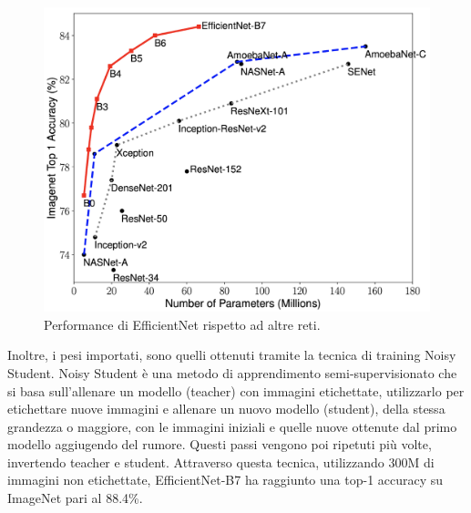         \begin{figure}[h!]
            \centering
            \includegraphics[scale=0.2]{Plot/efficientnet.png}
            \caption{Performance di EfficientNet rispetto ad altre reti.}
            \label{fig:efficientnet}
        \end{figure}
        
        Inoltre, i pesi importati, sono quelli ottenuti tramite la tecnica di training Noisy Student. Noisy Student è una metodo di apprendimento semi-supervisionato che si basa sull'allenare
        un modello (teacher) con immagini etichettate, utilizzarlo per etichettare nuove immagini e allenare un nuovo modello (student), della stessa grandezza o maggiore, con le immagini iniziali e 
        quelle nuove ottenute dal primo modello aggiugendo del rumore. Questi passi vengono poi ripetuti più volte, invertendo teacher e student. Attraverso questa tecnica, utilizzando
        300M di immagini non etichettate, EfficientNet-B7 ha raggiunto una top-1 accuracy su ImageNet pari al 88.4\%.

